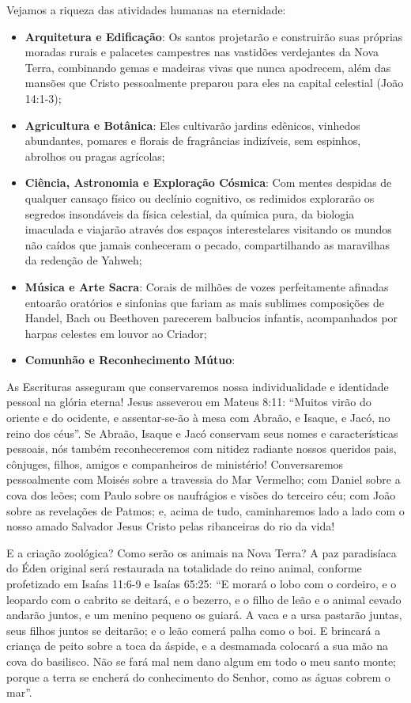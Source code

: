 \documentclass[11pt,a4paper,openany]{book}
\begin{document}
Vejamos a riqueza das atividades humanas na eternidade:
\begin{itemize}
  \item \textbf{Arquitetura e Edificação}: Os santos projetarão e construirão suas próprias moradas rurais e palacetes campestres nas vastidões verdejantes da Nova Terra, combinando gemas e madeiras vivas que nunca apodrecem, além das mansões que Cristo pessoalmente preparou para eles na capital celestial (João 14:1-3);
  \item \textbf{Agricultura e Botânica}: Eles cultivarão jardins edênicos, vinhedos abundantes, pomares e florais de fragrâncias indizíveis, sem espinhos, abrolhos ou pragas agrícolas;
  \item \textbf{Ciência, Astronomia e Exploração Cósmica}: Com mentes despidas de qualquer cansaço físico ou declínio cognitivo, os redimidos explorarão os segredos insondáveis da física celestial, da química pura, da biologia imaculada e viajarão através dos espaços interestelares visitando os mundos não caídos que jamais conheceram o pecado, compartilhando as maravilhas da redenção de Yahweh;
  \item \textbf{Música e Arte Sacra}: Corais de milhões de vozes perfeitamente afinadas entoarão oratórios e sinfonias que fariam as mais sublimes composições de Handel, Bach ou Beethoven parecerem balbucios infantis, acompanhados por harpas celestes em louvor ao Criador;
  \item \textbf{Comunhão e Reconhecimento Mútuo}:
\end{itemize}

As Escrituras asseguram que conservaremos nossa individualidade e identidade pessoal na glória eterna! Jesus asseverou em Mateus 8:11: ``Muitos virão do oriente e do ocidente, e assentar-se-ão à mesa com Abraão, e Isaque, e Jacó, no reino dos céus''. Se Abraão, Isaque e Jacó conservam seus nomes e características pessoais, nós também reconheceremos com nitidez radiante nossos queridos pais, cônjuges, filhos, amigos e companheiros de ministério! Conversaremos pessoalmente com Moisés sobre a travessia do Mar Vermelho; com Daniel sobre a cova dos leões; com Paulo sobre os naufrágios e visões do terceiro céu; com João sobre as revelações de Patmos; e, acima de tudo, caminharemos lado a lado com o nosso amado Salvador Jesus Cristo pelas ribanceiras do rio da vida!

E a criação zoológica? Como serão os animais na Nova Terra?
A paz paradisíaca do Éden original será restaurada na totalidade do reino animal, conforme profetizado em Isaías 11:6-9 e Isaías 65:25:
``E morará o lobo com o cordeiro, e o leopardo com o cabrito se deitará, e o bezerro, e o filho de leão e o animal cevado andarão juntos, e um menino pequeno os guiará. A vaca e a ursa pastarão juntas, seus filhos juntos se deitarão; e o leão comerá palha como o boi. E brincará a criança de peito sobre a toca da áspide, e a desmamada colocará a sua mão na cova do basilisco. Não se fará mal nem dano algum em todo o meu santo monte; porque a terra se encherá do conhecimento do Senhor, como as águas cobrem o mar''.
\end{document}
